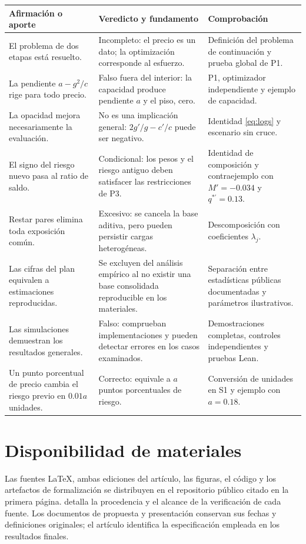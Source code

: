 \documentclass[11pt]{article}
\theoremstyle{definition}\newtheorem{assumption}{Supuesto}
\begin{document}
\begin{longtable}{L{.29\linewidth}L{.29\linewidth}L{.33\linewidth}}
\toprule Afirmación o aporte & Veredicto y fundamento & Comprobación\\\midrule
\endhead
El problema de dos etapas está resuelto. &
Incompleto: el precio es un dato; la optimización corresponde al esfuerzo. &
Definición del problema de continuación y prueba global de P1.\\
La pendiente $a-g^2/c$ rige para todo precio. &
Falso fuera del interior: la capacidad produce pendiente $a$ y el piso, cero. &
P1, optimizador independiente y ejemplo de capacidad.\\
La opacidad mejora necesariamente la evaluación. &
No es una implicación general: $2g'/g-c'/c$ puede ser negativo. &
Identidad \eqref{eq:logs} y escenario sin cruce.\\
El signo del riesgo nuevo pasa al ratio de saldo. &
Condicional: los pesos y el riesgo antiguo deben satisfacer las restricciones de P3. &
Identidad de composición y contraejemplo con $M'=-0.034$ y $q^{*\prime}=0.13$.\\
Restar pares elimina toda exposición común. &
Excesivo: se cancela la base aditiva, pero pueden persistir cargas heterogéneas. &
Descomposición con coeficientes $\lambda_j$.\\
Las cifras del plan equivalen a estimaciones reproducidas. &
Se excluyen del análisis empírico al no existir una base consolidada reproducible en los materiales. &
Separación entre estadísticas públicas documentadas y parámetros ilustrativos.\\
Las simulaciones demuestran los resultados generales. &
Falso: comprueban implementaciones y pueden detectar errores en los casos examinados. &
Demostraciones completas, controles independientes y pruebas Lean.\\
Un punto porcentual de precio cambia el riesgo previo en $0.01a$ unidades. &
Correcto: equivale a $a$ puntos porcentuales de riesgo. &
Conversión de unidades en S1 y ejemplo con $a=0.18$.\\
\bottomrule
\end{longtable}

\section{Disponibilidad de materiales}
Las fuentes LaTeX, ambas ediciones del artículo, las figuras, el código y los
artefactos de formalización se distribuyen en el repositorio público citado
en la primera página.  detalla la procedencia y el
alcance de la verificación de cada fuente. Los documentos de propuesta y
presentación conservan sus fechas y definiciones originales; el artículo
identifica la especificación empleada en los resultados finales.
\end{document}
